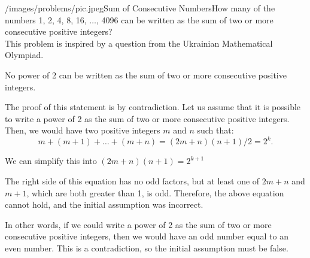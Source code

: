 \begin{problem}{/images/problems/pic.jpeg}{Sum of Consecutive Numbers}How many of the numbers 1, 2, 4, 8, 16, $\ldots$, 4096 can be written as the sum of two or more consecutive positive integers?\\[0.2cm]
	
	This problem is inspired by a question from the Ukrainian Mathematical Olympiad.
\end{problem}
\begin{solution}
No power of 2 can be written as the sum of two or more consecutive positive integers.

The proof of this statement is by contradiction. Let us assume that it is possible to write a power of 2 as the sum of two or more consecutive positive integers. Then, we would have two positive integers $m$ and $n$ such that: $$m+(m+1)+\ldots+(m+n)=(2m+n)(n+1)/2=2^k.$$ 

We can simplify this into
$(2m+n)(n+1)=2^{k+1}$


The right side of this equation has no odd factors, but at least one of $2m+n$ and $m+1$, which are both greater than 1, is odd. Therefore, the above equation cannot hold, and the initial assumption was incorrect.

In other words, if we could write a power of 2 as the sum of two or more consecutive positive integers, then we would have an odd number equal to an even number. This is a contradiction, so the initial assumption must be false.
\end{solution}
